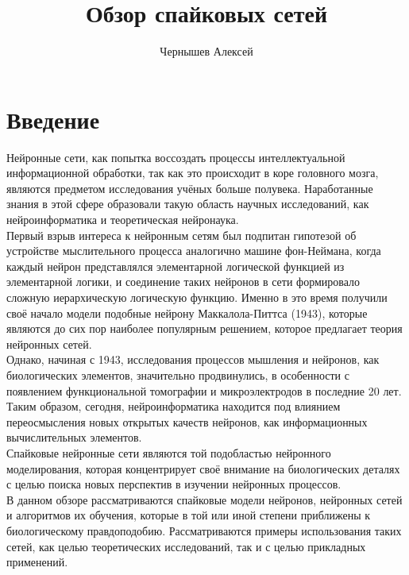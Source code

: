 \documentclass[a4paper,10pt]{article}
\title{Обзор спайковых сетей}
\author{Чернышев Алексей}
\begin{document}


\tableofcontents
\clearpage
\section{Введение}
\indent Нейронные сети, как попытка воссоздать процессы интеллектуальной информационной обработки, так как это происходит в коре головного мозга, являются предметом исследования учёных больше полувека. Наработанные знания в этой сфере образовали такую область научных исследований, как нейроинформатика и теоретическая нейронаука.\\
\indent Первый взрыв интереса к нейронным сетям был подпитан гипотезой об устройстве мыслительного процесса аналогично машине фон-Неймана, когда каждый нейрон представлялся элементарной логической функцией из элементарной логики, и соединение таких нейронов в сети формировало сложную иерархическую логическую функцию. Именно в это время получили своё начало модели подобные нейрону Маккалола-Питтса (1943), которые являются до сих пор наиболее популярным решением, которое предлагает теория нейронных сетей.\\
\indent Однако, начиная с 1943, исследования процессов мышления и нейронов, как биологических элементов, значительно продвинулись, в особенности с появлением функциональной томографии и микроэлектродов в последние 20 лет. Таким образом, сегодня, нейроинформатика находится под влиянием переосмысления новых открытых качеств нейронов\cite{BohteReview}, как информационных вычислительных элементов.\\
\indent Спайковые нейронные сети являются той подобластью нейронного моделирования, которая концентрирует своё внимание на биологических деталях с целью поиска новых перспектив в изучении нейронных процессов.\\
\indent В данном обзоре рассматриваются спайковые модели нейронов, нейронных сетей и алгоритмов их обучения, которые в той или иной степени приближены к биологическому правдоподобию. Рассматриваются примеры использования таких сетей, как целью теоретических исследований, так и с целью прикладных применений.\\
\end{document}
